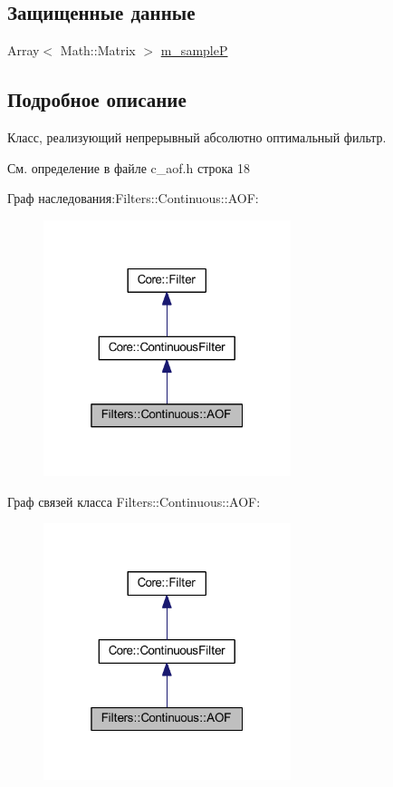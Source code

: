 \subsection*{Защищенные данные}
\begin{DoxyCompactItemize}
\item 
Array$<$ Math\+::\+Matrix $>$ \hyperlink{class_filters_1_1_continuous_1_1_a_o_f_a3cff90f7e12e677f04102f1717ef7a49}{m\+\_\+sampleP}
\end{DoxyCompactItemize}


\subsection{Подробное описание}
Класс, реализующий непрерывный абсолютно оптимальный фильтр. 

См. определение в файле c\+\_\+aof.\+h строка 18



Граф наследования\+:Filters\+:\+:Continuous\+:\+:A\+OF\+:\nopagebreak
\begin{figure}[H]
\begin{center}
\leavevmode
\includegraphics[width=205pt]{class_filters_1_1_continuous_1_1_a_o_f__inherit__graph}
\end{center}
\end{figure}


Граф связей класса Filters\+:\+:Continuous\+:\+:A\+OF\+:\nopagebreak
\begin{figure}[H]
\begin{center}
\leavevmode
\includegraphics[width=205pt]{class_filters_1_1_continuous_1_1_a_o_f__coll__graph}
\end{center}
\end{figure}


